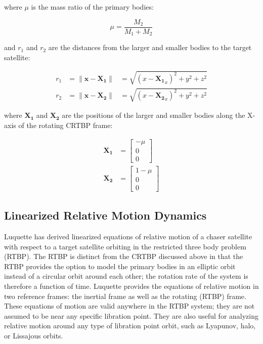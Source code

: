 \documentclass[a4paper]{article}
\begin{document}
where \(\mu\) is the mass ratio of the primary bodies:

\begin{equation*}
\mu = \frac{M_2}{M_1 + M_2}
\end{equation*}

and \(r_1\) and \(r_2\) are the distances from the larger and smaller bodies to the target satellite:

\begin{equation*}
\begin{aligned}
r_1 &= \| \mathbf{x} - \mathbf{X_1} \| &= \sqrt{(x-\mathbf{X_1}_x)^2 + y^2 + z^2} \\
r_2 &= \| \mathbf{x} - \mathbf{X_2} \| &= \sqrt{(x-\mathbf{X_2}_x)^2 + y^2 + z^2}
\end{aligned}
\end{equation*}

where \(\mathbf{X_1}\) and \(\mathbf{X_2}\) are the positions of the larger and smaller bodies along the X-axis of the rotating CRTBP frame:

\begin{equation*}
\begin{aligned}
\mathbf{X_1} &= \begin{bmatrix}
						-\mu \\ 0 \\ 0 
						\end{bmatrix} \\
\mathbf{X_2} &= \begin{bmatrix}
						1 - \mu \\ 0 \\ 0
						\end{bmatrix}
\end{aligned}
\end{equation*}


\subsection{Linearized Relative Motion Dynamics}
Luquette \cite{luquette2004} has derived linearized equations of relative motion of a chaser satellite with respect to a target satellite orbiting in the restricted three body problem (RTBP). The RTBP is distinct from the CRTBP discussed above in that the RTBP provides the option to model the primary bodies in an elliptic orbit instead of a circular orbit around each other; the rotation rate of the system is therefore a function of time. Luquette provides the equations of relative motion in two reference frames: the inertial frame as well as the rotating (RTBP) frame.  These equations of motion are valid anywhere in the RTBP system; they are not assumed to be near any specific libration point.  They are also useful for analyzing relative motion around any type of libration point orbit, such as Lyapunov, halo, or Lissajous orbits. 
\end{document}
